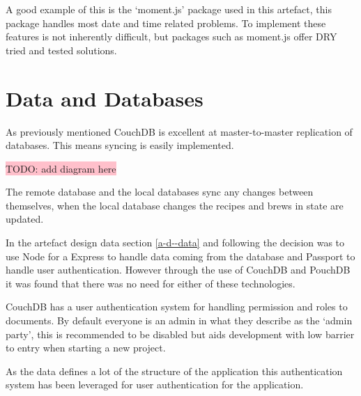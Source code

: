 A good example of this is the `moment.js' package used in this artefact, this package handles most date and time related problems. To implement these features is not inherently difficult, but packages such as moment.js offer DRY tried and tested solutions. \cite{moment.js}

\section{Data and Databases} \label{s-i--data-and-databases}

As previously mentioned CouchDB is excellent at master-to-master replication of databases. This means syncing is easily implemented.

\colorbox{pink}{TODO: add diagram here}

The remote database and the local databases sync any changes between themselves, when the local database changes the recipes and brews in state are updated.

In the artefact design data section \ref{a-d--data} and following the decision was to use Node for a Express to handle data coming from the database and Passport to handle user authentication. However through the use of CouchDB and PouchDB it was found that there was no need for either of these technologies.

CouchDB has a user authentication system for handling permission and roles to documents. By default everyone is an admin in what they describe as the `admin party', this is recommended to be disabled but aids development with low barrier to entry when starting a new project.

As the data defines a lot of the structure of the application this authentication system has been leveraged for user authentication for the application.




